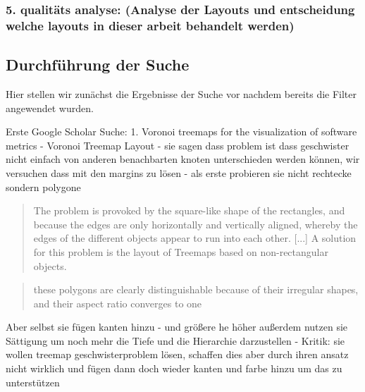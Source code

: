 \subsubsection*{5. qualitäts analyse: (Analyse der Layouts und entscheidung welche layouts in dieser arbeit behandelt werden)} \label{sec:QualitaetsAnalyse}

\subsection{Durchführung der Suche}
Hier stellen wir zunächst die Ergebnisse der Suche vor nachdem bereits die Filter angewendet wurden.

Erste Google Scholar Suche:
1. Voronoi treemaps for the visualization of software metrics \cite{voronoiTree}
- Voronoi Treemap Layout
- sie sagen dass problem ist dass geschwister nicht einfach von anderen benachbarten knoten unterschieden werden können, wir versuchen dass mit den margins zu lösen
- als erste probieren sie nicht rechtecke sondern polygone
\begin{quote}
    The problem is provoked by the square-like shape of the rectangles, and because the edges are only horizontally and vertically aligned, whereby the edges of the different objects appear to run into each other. [...] A solution for this problem is the layout of Treemaps based on non-rectangular objects.\cite[3]{voronoiTree}
\end{quote}
\begin{quote}
    these polygons are clearly distinguishable because of their irregular shapes, and their aspect ratio converges to one \cite[6]{voronoiTree}
\end{quote}
Aber selbst sie fügen kanten hinzu - und größere he höher
außerdem nutzen sie Sättigung um noch mehr die Tiefe und die Hierarchie darzustellen
- Kritik: sie wollen treemap geschwisterproblem lösen, schaffen dies aber durch ihren ansatz nicht wirklich und fügen dann doch wieder kanten und farbe hinzu um das zu unterstützen


